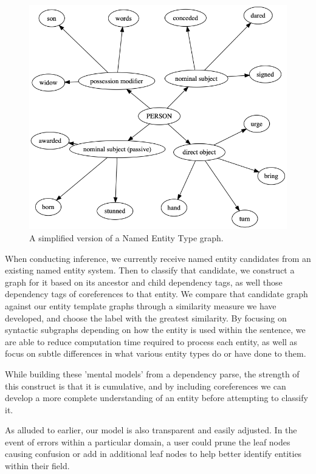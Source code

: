 \documentclass[11pt,a4paper]{article}
\begin{document}
\begin{figure}[h]
  \includegraphics[width=\linewidth]{figures/G_PERSON.png}
  \caption{A simplified version of a Named Entity Type graph.}
  \label{fig:person_graph}
\end{figure}

When conducting inference, we currently receive named entity candidates from an existing named entity system. Then to classify that candidate, we construct a graph for it based on its ancestor and child dependency tags, as well those dependency tags of coreferences to that entity. We compare that candidate graph against our entity template graphs through a similarity measure we have developed, and choose the label with the greatest similarity. By focusing on syntactic subgraphs depending on how the entity is used within the sentence, we are able to reduce computation time required to process each entity, as well as focus on subtle differences in what various entity types do or have done to them.

While building these 'mental models' from a dependency parse, the strength of this construct is that it is cumulative, and by including coreferences we can develop a more complete understanding of an entity before attempting to classify it.

As alluded to earlier, our model is also transparent and easily adjusted. In the event of errors within a particular domain, a user could prune the leaf nodes causing confusion or add in additional leaf nodes to help better identify entities within their field.
\end{document}
